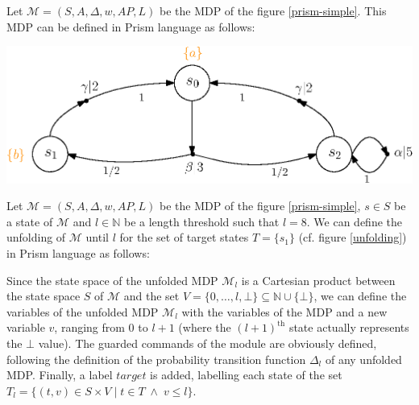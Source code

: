 \begin{example}
Let $\mathcal{M}=(S, A, \Delta, w, AP, L)$ be the MDP of the figure \ref{prism-simple}. This MDP can be defined in Prism language as follows:\\
\begin{minipage}{0.4\linewidth}
  
\end{minipage}
\begin{minipage}{0.6\linewidth}
    \includegraphics[width=\linewidth]{resources/simple-mdp}
    \captionsetup{justification=centering}
    \label{prism-simple}
\end{minipage}
\end{example}

\begin{example}
Let $\mathcal{M}=(S, A, \Delta, w, AP, L)$ be the MDP of the figure \ref{prism-simple}, $s \in S$ be a state of $\mathcal{M}$ and $l \in \mathbb{N}$
be a length threshold such that $l=8$. We can define the unfolding of $\mathcal{M}$ until $l$ for the set of target states $T = \{s_1\}$ (cf. figure \ref{unfolding}) in Prism language as follows:

\end{example}
Since the state space of the unfolded MDP $\mathcal{M}_l$ is a Cartesian product between the state space $S$ of $\mathcal{M}$ and the set $V = \{0, \dots, l, \bot\} \subseteq \mathbb{N} \cup \{\bot\}$, we can define the variables of the unfolded MDP $\mathcal{M}_l$ with the variables of the MDP and a new variable $v$, ranging from $0$ to $l+1$ (where the $(l+1)^\text{th}$ state actually represents the $\bot$ value). The guarded
commands of the module are obviously defined, following the definition of the
probability transition function $\Delta_l$ of any unfolded MDP. Finally, a label $target$ is added,
labelling each state of the set $T_l = \{ (t, v) \in S \times V \; | \; t \in T \; \wedge \; v \leq l \}$.
